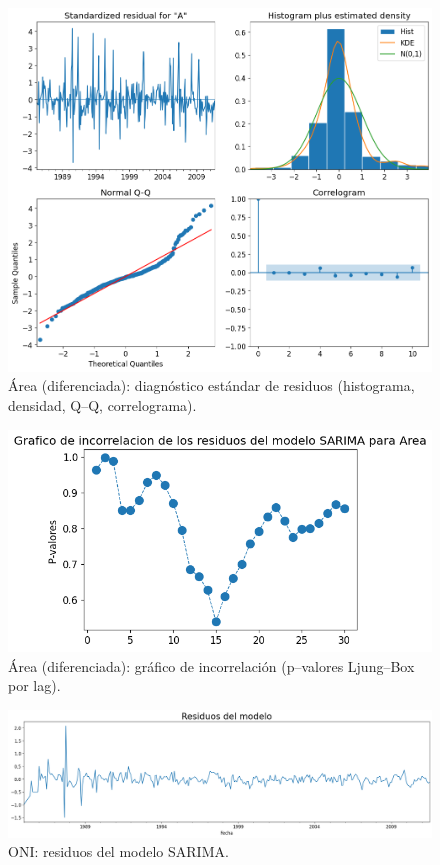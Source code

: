 \begin{figure}[H]\centering
\includegraphics[scale=.52]{Figures/res_std_area_d.png}
\caption{Área (diferenciada): diagnóstico estándar de residuos (histograma, densidad, Q--Q, correlograma).}
\label{fig:std_area_d}
\end{figure}

\begin{figure}[H]\centering
\includegraphics[scale=.52]{Figures/inco_area_d.png}
\caption{Área (diferenciada): gráfico de incorrelación (p--valores Ljung--Box por lag).}
\label{fig:inco_area_d}
\end{figure}

\begin{figure}[H]\centering
\includegraphics[scale=.30]{Figures/res_sarima_oni.png}
\caption{ONI: residuos del modelo SARIMA.}
\label{fig:res_oni}
\end{figure}

